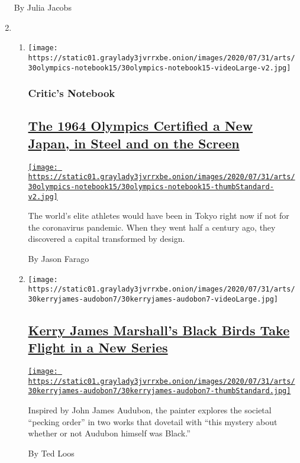 \begin{enumerate}
  By Julia Jacobs
\item
  \begin{enumerate}
  \def\labelenumii{\arabic{enumii}.}
  \item
    \texttt{[image: https://static01.graylady3jvrrxbe.onion/images/2020/07/31/arts/30olympics-notebook15/30olympics-notebook15-videoLarge-v2.jpg]}

    \hypertarget{critics-notebook}{%
    \subsubsection{Critic's Notebook}\label{critics-notebook}}

    \hypertarget{the-1964-olympics-certified-a-new-japan-in-steel-and-on-the-screen}{%
    \subsection{\texorpdfstring{\href{/2020/07/30/arts/design/tokyo-olympics-1964-design.html}{The
    1964 Olympics Certified a New Japan, in Steel and on the
    Screen}}{The 1964 Olympics Certified a New Japan, in Steel and on the Screen}}\label{the-1964-olympics-certified-a-new-japan-in-steel-and-on-the-screen}}

    \href{/2020/07/30/arts/design/tokyo-olympics-1964-design.html}{\texttt{[image: https://static01.graylady3jvrrxbe.onion/images/2020/07/31/arts/30olympics-notebook15/30olympics-notebook15-thumbStandard-v2.jpg]}}

    The world's elite athletes would have been in Tokyo right now if not
    for the coronavirus pandemic. When they went half a century ago,
    they discovered a capital transformed by design.

    By Jason Farago
  \item
    \texttt{[image: https://static01.graylady3jvrrxbe.onion/images/2020/07/31/arts/30kerryjames-audobon7/30kerryjames-audobon7-videoLarge.jpg]}

    \hypertarget{kerry-james-marshalls-black-birds-take-flight-in-a-new-series}{%
    \subsection{\texorpdfstring{\href{/2020/07/29/arts/design/kerry-james-marshall-audubon.html}{Kerry
    James Marshall's Black Birds Take Flight in a New
    Series}}{Kerry James Marshall's Black Birds Take Flight in a New Series}}\label{kerry-james-marshalls-black-birds-take-flight-in-a-new-series}}

    \href{/2020/07/29/arts/design/kerry-james-marshall-audubon.html}{\texttt{[image: https://static01.graylady3jvrrxbe.onion/images/2020/07/31/arts/30kerryjames-audobon7/30kerryjames-audobon7-thumbStandard.jpg]}}

    Inspired by John James Audubon, the painter explores the societal
    ``pecking order'' in two works that dovetail with ``this mystery
    about whether or not Audubon himself was Black.''

    By Ted Loos
  \end{enumerate}
\end{enumerate}

